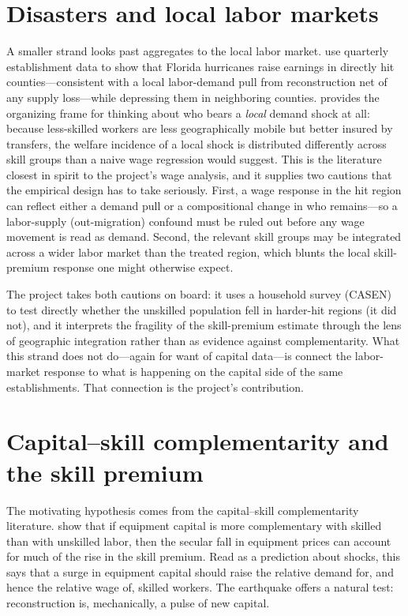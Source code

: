 \documentclass[12pt]{article}
\begin{document}
\section{Disasters and local labor markets}

A smaller strand looks past aggregates to the local labor market. \citet{belasen2009} use
quarterly establishment data to show that Florida hurricanes raise earnings in directly hit
counties---consistent with a local labor-demand pull from reconstruction net of any supply
loss---while depressing them in neighboring counties. \citet{notowidigdo2020} provides the
organizing frame for thinking about who bears a \emph{local} demand shock at all: because less-skilled
workers are less geographically mobile but better insured by transfers, the welfare incidence of
a local shock is distributed differently across skill groups than a naive wage regression would
suggest. This is the literature closest in spirit to the project's wage analysis, and it supplies
two cautions that the empirical design has to take seriously. First, a wage response in the hit
region can reflect either a demand pull or a compositional change in who remains---so a labor-supply
(out-migration) confound must be ruled out before any wage movement is read as demand. Second,
the relevant skill groups may be integrated across a wider labor market than the treated region,
which blunts the local skill-premium response one might otherwise expect.

The project takes both cautions on board: it uses a household survey (CASEN) to test directly
whether the unskilled population fell in harder-hit regions (it did not), and it interprets the
fragility of the skill-premium estimate through the lens of geographic integration rather than
as evidence against complementarity. What this strand does not do---again for want of
capital data---is connect the labor-market response to what is happening on the capital side of
the same establishments. That connection is the project's contribution.

\section{Capital--skill complementarity and the skill premium}

The motivating hypothesis comes from the capital--skill complementarity literature.
\citet{krusell2000} show that if equipment capital is more complementary with skilled than with
unskilled labor, then the secular fall in equipment prices can account for much of the rise in
the skill premium. Read as a prediction about shocks, this says that a surge in equipment
capital should raise the relative demand for, and hence the relative wage of, skilled workers.
The earthquake offers a natural test: reconstruction is, mechanically, a pulse of new capital.
\end{document}
